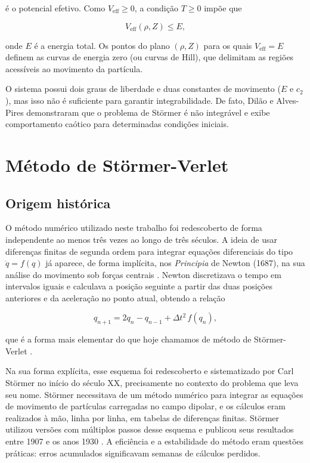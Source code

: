 \documentclass[twocolumn]{rbef}
\begin{document}
\noindent é o potencial efetivo. Como $V_{\text{eff}} \geq 0$, a condição $T \geq 0$ impõe que

\begin{equation}
    V_{\text{eff}}(\rho, Z) \leq E,
\end{equation}

\noindent onde $E$ é a energia total. Os pontos do plano $(\rho, Z)$ para os quais $V_{\text{eff}} = E$ definem as curvas de energia zero (ou curvas de Hill), que delimitam as regiões acessíveis ao movimento da partícula.

O sistema possui dois graus de liberdade e duas constantes de movimento ($E$ e $c_2$), mas isso não é suficiente para garantir integrabilidade. De fato, Dilão e Alves-Pires \cite{ruidilao} demonstraram que o problema de Störmer é não integrável e exibe comportamento caótico para determinadas condições iniciais.

\section{Método de Störmer-Verlet}

\subsection{Origem histórica}

O método numérico utilizado neste trabalho foi redescoberto de forma independente ao menos três vezes ao longo de três séculos. A ideia de usar diferenças finitas de segunda ordem para integrar equações diferenciais do tipo $\ddot{q} = f(q)$ já aparece, de forma implícita, nos \textit{Principia} de Newton (1687), na sua análise do movimento sob forças centrais \cite{Newton}. Newton discretizava o tempo em intervalos iguais e calculava a posição seguinte a partir das duas posições anteriores e da aceleração no ponto atual, obtendo a relação

\begin{equation}\label{verletBasico}
    q_{n+1} = 2q_n - q_{n-1} + \Delta t^2\, f(q_n),
\end{equation}

\noindent que é a forma mais elementar do que hoje chamamos de método de Störmer-Verlet \cite{stormer-verlet, Hairer2003}.

Na sua forma explícita, esse esquema foi redescoberto e sistematizado por Carl Störmer no início do século XX, precisamente no contexto do problema que leva seu nome. Störmer necessitava de um método numérico para integrar as equações de movimento de partículas carregadas no campo dipolar, e os cálculos eram realizados à mão, linha por linha, em tabelas de diferenças finitas. Störmer utilizou versões com múltiplos passos desse esquema e publicou seus resultados entre 1907 e os anos 1930 \cite{Stormer, Stormer3}. A eficiência e a estabilidade do método eram questões práticas: erros acumulados significavam semanas de cálculos perdidos.
\end{document}

